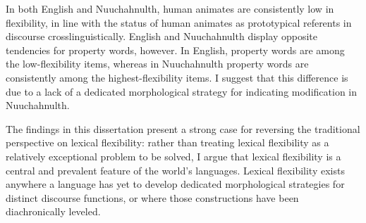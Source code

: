 In both English and Nuuchahnulth, human animates are consistently low in flexibility, in line with the status of human animates as prototypical referents in discourse crosslinguistically. English and Nuuchahnulth display opposite tendencies for property words, however. In English, property words are among the low-flexibility items, whereas in Nuuchahnulth property words are consistently among the highest-flexibility items. I suggest that this difference is due to a lack of a dedicated morphological strategy for indicating modification in Nuuchahnulth.

The findings in this dissertation present a strong case for reversing the traditional perspective on lexical flexibility: rather than treating lexical flexibility as a relatively exceptional problem to be solved, I argue that lexical flexibility is a central and prevalent feature of the world's languages. Lexical flexibility exists anywhere a language has yet to develop dedicated morphological strategies for distinct discourse functions, or where those constructions have been diachronically leveled.
